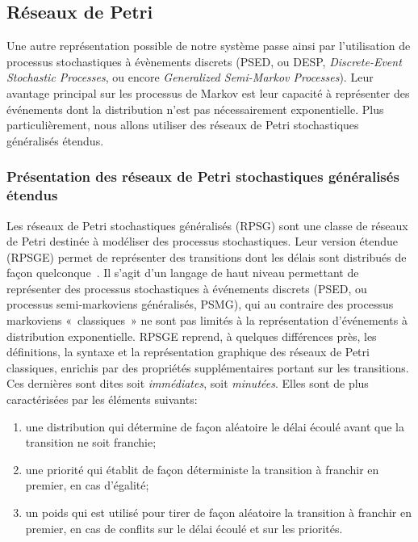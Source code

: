     \subsection{Réseaux de Petri}
Une autre représentation possible de notre système passe ainsi par l'utilisation de processus stochastiques à évènements discrets (PSED, ou DESP, \textit{Discrete-Event Stochastic Processes}, ou encore \textit{Generalized Semi-Markov Processes}).
Leur avantage principal sur les processus de Markov est leur capacité à représenter des événements dont la distribution n'est pas nécessairement exponentielle.
Plus particulièrement, nous allons utiliser des réseaux de Petri stochastiques généralisés étendus.

        \subsubsection{Présentation des réseaux de Petri stochastiques généralisés étendus}
\label{sa:subsubsec:presRPSGE}
Les réseaux de Petri stochastiques généralisés (RPSG) sont une classe de réseaux de Petri destinée à modéliser des processus stochastiques.
Leur version étendue (RPSGE) permet de représenter des transitions dont les délais sont distribués de façon quelconque~\cite{ABCDF95}.
Il s'agit d'un langage de haut niveau permettant de représenter des processus stochastiques à événements discrets (PSED, ou processus semi-markoviens généralisés, PSMG), qui au contraire des processus markoviens «~classiques~» ne sont pas limités à la représentation d'événements à distribution exponentielle.
RPSGE reprend, à quelques différences près, les définitions, la syntaxe et la représentation graphique des réseaux de Petri classiques, enrichis par des propriétés supplémentaires portant sur les transitions.
Ces dernières sont dites soit \textit{immédiates}, soit \textit{minutées}.
Elles sont de plus caractérisées par les éléments suivants:
\begin{enumerate}
    \item une distribution qui détermine de façon aléatoire le délai écoulé avant que la transition ne soit franchie;
    \item une priorité qui établit de façon déterministe la transition à franchir en premier, en cas d'égalité;
    \item un poids qui est utilisé pour tirer de façon aléatoire la transition à franchir en premier, en cas de conflits sur le délai écoulé et sur les priorités.
\end{enumerate}

